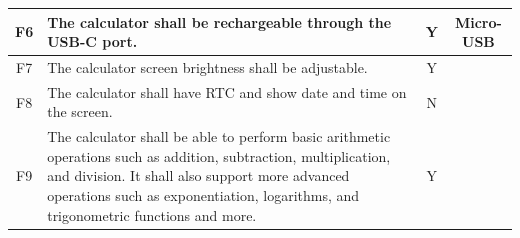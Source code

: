 \documentclass[a4paper, twoside]{report}
\begin{document}
\begin{table}[H]
\begin{tabular}{|c{}|p{}|c{}|c{}|}
F6  & The calculator shall be rechargeable through the USB-C port.                                                                                                                                                                                                                                                                                                                & Y                     & Micro-USB \\ \hline
F7  & The calculator screen brightness shall be adjustable.                                                                                                                                                                                                                                                                                                                       & Y                     &  \\ \hline
F8  & The calculator shall have RTC and show date and time on the screen.                                                                                                                                                                                                                                                                                                         & N                     &  \\ \hline
F9  & The calculator shall be able to perform basic arithmetic operations such as addition, subtraction, multiplication, and division. It shall also support more advanced operations such as exponentiation, logarithms, and trigonometric functions and more. & Y          &  \\ \hline
\end{tabular}
\end{table}
\end{document}
